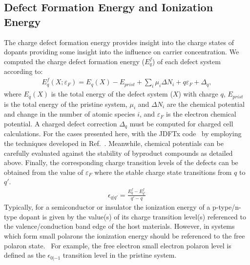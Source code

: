 \subsection{Defect Formation Energy and Ionization Energy}
The charge defect formation energy provides insight into the charge states of dopants providing some insight into the influence on carrier concentration.
We computed the charge defect formation energy ($E^f_q$) of each defect system according to:
\begin{align}
    E^f_q(X; \varepsilon_F) = E_q(X) - E_{prist} + \sum_i \mu_i \Delta N_i + q \varepsilon_F + \Delta_q,
    \label{intro:eq:cfe}
\end{align}
where $E_q(X)$ is the total energy of the defect system ($X$) with charge $q$, $E_{prist}$ is the total energy of the pristine system, $\mu_i$ and $\Delta N_i$ are the chemical potential and change in the number of atomic species $i$, and $\varepsilon_F$ is the electron chemical potential. A charged defect correction $\Delta_q$ must be computed for charged cell calculations. For the cases presented here, with the JDFTx code~\cite{JDFTx} by employing the techniques developed in Ref.~\cite{wu2017first,ping2013}. Meanwhile, chemical potentials can be carefully evaluated against the stability of byproduct compounds as detailed above.
Finally, the corresponding charge transition levels of the defects can be obtained from the value of $\varepsilon_F$ where the stable charge state transitions from $q$ to $q'$.
\begin{align}
    \epsilon_{q|q'} = \frac{E^f_q - E^f_{q'}}{q' - q}
    \label{eq:ctl}
\end{align}
Typically, for a semiconductor or insulator the ionization energy of a p-type/n-type dopant is given by the value(s) of its charge transition level(s) referenced to the valence/conduction band edge of the host materials. However, in systems which form small polarons the ionization energy should be referenced to the free polaron state.~\cite{smart2017effect,seo2018role} For example, the free electron small electron polaron level is defined as the $\epsilon_{0|-1}$ transition level in the pristine system.



